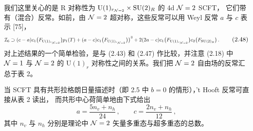 我们这里关心的是 R 对称性为 $\mathrm{U}(1)_{r_{\mathcal{N}=2}}\times\mathrm{SU}(2)_R$ 的 4d $\mathcal{N}=2$ SCFT，
它们带有（混合）反常。如前，由 $\mathcal{N}=2$ 超对称，这些反常可以用 Weyl 反常 $a$ 与 $c$ 表示 [75]，
\begin{equation}
  \resizebox{0.98\textwidth}{!}{$\displaystyle
  \cI_6\supset(c-a)c_1\big(F_{\mathrm{U}(1)_{r_{\cN=2}}}\big)p_1(T)+(a-c)c_1\big(F_{\mathrm{U}(1)_{r_{\cN=2}}}\big)\big)^3
  +2(2a-c)c_1\big(F_{\mathrm{U}(1)_{r_{\cN=2}}}\big)c_2\big(F_{\SU(2)_R}\big)\,.$}
  \tag{2.48}
\end{equation}
对上述结果的一个简单检验，是与 (2.43) 和 (2.47) 作比较，并注意 (2.18) 中 $\mathcal{N}=1$ 与
$\mathcal{N}=2$ 的 $\mathrm{U}(1)_r$ 对称性之间的关系。我们把 $\mathcal{N}=2$ 自由场的反常汇总于表 2。


\begin{center}
\end{center}


当 SCFT 具有共形拉格朗日量描述时（即 2.5 中 $b=0$ 的情形），'t Hooft 反常可直接从表 2 读出，
而共形中心荷简单地由下式给出
\begin{equation}
  a=\frac{5n_v+n_h}{24}\,,\qquad c=\frac{2n_v+n_h}{12}\,,
  \tag{2.49}
\end{equation}
其中 $n_v$ 与 $n_h$ 分别是理论中 $\mathcal{N}=2$ 矢量多重态与超多重态的总数。

